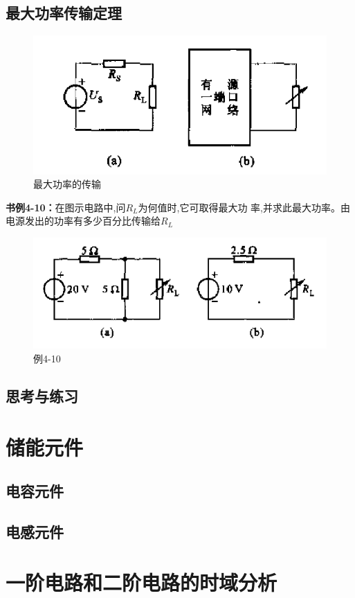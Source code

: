 \documentclass[11pt,a4paper,oneside]{book}
\begin{document}
\section{最大功率传输定理}
\begin{figure}[H]
	\centering
	\includegraphics[width=0.5\linewidth]{screenshot065}
	\caption{最大功率的传输}
	\label{fig:screenshot065}
\end{figure}

\noindent\textbf{书例4-10：}在图示电路中,问$R_L$为何值时,它可取得最大功
率,并求此最大功率。由电源发出的功率有多少百分比传输给$R_L$
\begin{figure}[H]
	\centering
	\includegraphics[width=0.5\linewidth]{screenshot076}
	\caption{例4-10}
	\label{fig:screenshot076}
\end{figure}


\section{思考与练习}



\chapter{储能元件}
\section{电容元件}





\section{电感元件}

\chapter{一阶电路和二阶电路的时域分析}
\end{document}
